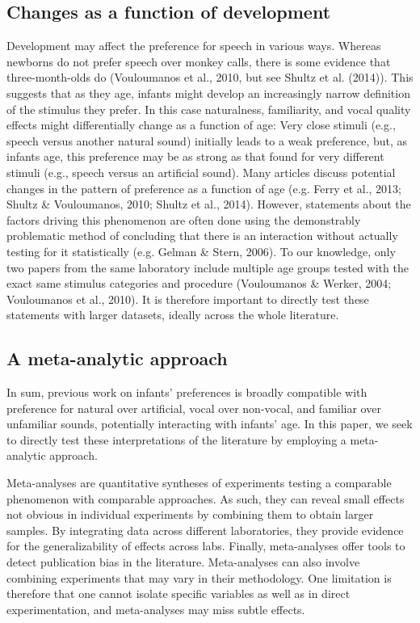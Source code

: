\documentclass[man]{apa6}
\begin{document}
\subsection{Changes as a function of
development}\label{changes-as-a-function-of-development}

Development may affect the preference for speech in various ways.
Whereas newborns do not prefer speech over monkey calls, there is some
evidence that three-month-olds do (Vouloumanos et al., 2010, but see
Shultz et al. (2014)). This suggests that as they age, infants might
develop an increasingly narrow definition of the stimulus they prefer.
In this case naturalness, familiarity, and vocal quality effects might
differentially change as a function of age: Very close stimuli (e.g.,
speech versus another natural sound) initially leads to a weak
preference, but, as infants age, this preference may be as strong as
that found for very different stimuli (e.g., speech versus an artificial
sound). Many articles discuss potential changes in the pattern of
preference as a function of age (e.g. Ferry et al., 2013; Shultz \&
Vouloumanos, 2010; Shultz et al., 2014). However, statements about the
factors driving this phenomenon are often done using the demonstrably
problematic method of concluding that there is an interaction without
actually testing for it statistically (e.g. Gelman \& Stern, 2006). To
our knowledge, only two papers from the same laboratory include multiple
age groups tested with the exact same stimulus categories and procedure
(Vouloumanos \& Werker, 2004; Vouloumanos et al., 2010). It is therefore
important to directly test these statements with larger datasets,
ideally across the whole literature.

\subsection{A meta-analytic approach}\label{a-meta-analytic-approach}

In sum, previous work on infants' preferences is broadly compatible with
preference for natural over artificial, vocal over non-vocal, and
familiar over unfamiliar sounds, potentially interacting with infants'
age. In this paper, we seek to directly test these interpretations of
the literature by employing a meta-analytic approach.

Meta-analyses are quantitative syntheses of experiments testing a
comparable phenomenon with comparable approaches. As such, they can
reveal small effects not obvious in individual experiments by combining
them to obtain larger samples. By integrating data across different
laboratories, they provide evidence for the generalizability of effects
across labs. Finally, meta-analyses offer tools to detect publication
bias in the literature. Meta-analyses can also involve combining
experiments that may vary in their methodology. One limitation is
therefore that one cannot isolate specific variables as well as in
direct experimentation, and meta-analyses may miss subtle effects.
\end{document}
